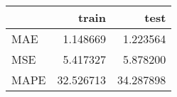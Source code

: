 \begin{tabular}{lrr}
\toprule
{} &      train &       test \\
\midrule
MAE  &   1.148669 &   1.223564 \\
MSE  &   5.417327 &   5.878200 \\
MAPE &  32.526713 &  34.287898 \\
\bottomrule
\end{tabular}
